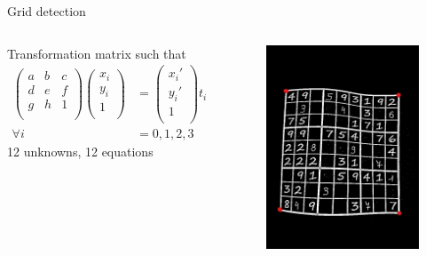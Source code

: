 \documentclass[12pt, dvipsnames]{beamer}
\begin{document}
\begin{frame}{Grid detection}
    \begin{columns}
        \alert{Transformation matrix} such that
        \begin{align*}
            \begin{pmatrix}
                a & b & c \\
                d & e & f \\
                g & h & 1 \\
            \end{pmatrix}
            \begin{pmatrix}
                x_i \\
                y_i \\
                1 \\
            \end{pmatrix}
            & =
            \begin{pmatrix}
                x_i' \\
                y_i' \\
                1 \\
            \end{pmatrix}
            t_i \\
            \forall i & = 0, 1, 2, 3
        \end{align*}
        12 unknowns, 12 equations
        \begin{figure}
            \centering
            \includegraphics[width=1\textwidth]{resources/sudoku/sudoku_0025_02_dot.jpg}

\end{figure}
\end{columns}
\end{frame}
\end{document}

